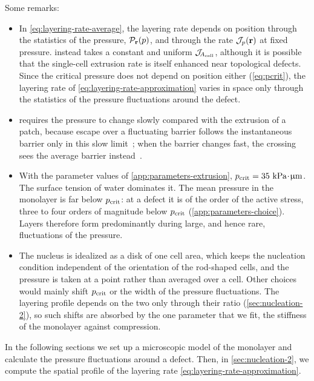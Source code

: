 \documentclass[aps,pre,reprint,superscriptaddress,longbibliography,nofootinbib
]{revtex4-2}
\begin{document}
Some remarks:
\begin{itemize}
  \item In \cref{eq:layering-rate-average}, the layering
  rate depends on position through the statistics of the
  pressure, $\mathcal{P}_{\mathbf{r}}(p)$, and through the rate
  $\mathcal{J}_p(\mathbf{r})$ at fixed pressure.
   instead takes a
  constant and uniform $\mathcal{J}_{\!{A_{\rm cell}}}$, although it is
  possible that the single-cell extrusion rate is itself
  enhanced near topological defects. Since the
  critical pressure does not depend on position either
  (\cref{eq:pcrit}), the layering rate of
  \cref{eq:layering-rate-approximation} varies in
  space only through the statistics of the pressure
  fluctuations around the defect.

  \item {} requires the
  pressure to change slowly compared with the extrusion of
  a patch, because escape over a fluctuating barrier
  follows the instantaneous barrier only in this slow
  limit~\cite{reimann1995thermally}; when the barrier
  changes fast, the crossing sees the average barrier
  instead~\cite{doering1992resonant}.

\item With the parameter values of
\cref{app:parameters-extrusion},
$p_{\rm crit}=35~\text{kPa}\mkern1mu\mathord{\cdot}\mkern1mu\upmu\mathrm{m}$. The surface tension of water
dominates it. The mean pressure in the monolayer is far
below $p_{\rm crit}$: at a defect it is of the order of the
active stress, three to four orders of magnitude below
$p_{\rm crit}$ (\cref{app:parameters-choice}). Layers therefore
form predominantly during large, and hence rare,
fluctuations of the pressure.

\item The nucleus is idealized as a disk of one cell area,
which keeps the nucleation condition independent of the
orientation of the rod-shaped cells, and the pressure is
taken at a point rather than averaged over a cell. Other
choices would mainly shift $p_{\rm crit}$ or the width of the
pressure fluctuations. The layering profile depends on the
two only through their ratio (\cref{sec:nucleation-2}), so
such shifts are absorbed by the one parameter that we fit,
the stiffness of the monolayer against compression.
\end{itemize}


In the following sections we set up a microscopic model of
the monolayer and calculate the pressure fluctuations
around a defect. Then, in \cref{sec:nucleation-2}, we
compute the spatial profile of the layering rate
\eqref{eq:layering-rate-approximation}.
\end{document}
